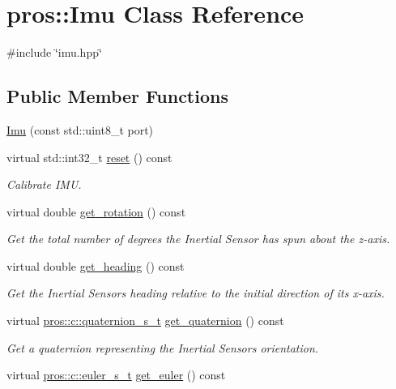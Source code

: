 \hypertarget{classpros_1_1Imu}{}\section{pros\+:\+:Imu Class Reference}
\label{classpros_1_1Imu}


{\ttfamily \#include \char`\"{}imu.\+hpp\char`\"{}}

\subsection*{Public Member Functions}
\begin{DoxyCompactItemize}
\item 
\hyperlink{classpros_1_1Imu_aac194322ec0563c1c73f540733e7cc4e}{Imu} (const std\+::uint8\+\_\+t port)
\item 
virtual std\+::int32\+\_\+t \hyperlink{classpros_1_1Imu_ad7973cfad5f8f83e7007342055197c43}{reset} () const
\begin{DoxyCompactList}\small\item\em Calibrate I\+MU. \end{DoxyCompactList}\item 
virtual double \hyperlink{classpros_1_1Imu_ac8bd7a19a6b4fc0c207a895efd3f0b48}{get\+\_\+rotation} () const
\begin{DoxyCompactList}\small\item\em Get the total number of degrees the Inertial Sensor has spun about the z-\/axis. \end{DoxyCompactList}\item 
virtual double \hyperlink{classpros_1_1Imu_a35c7953c5def3c034763af25c4dbebe3}{get\+\_\+heading} () const
\begin{DoxyCompactList}\small\item\em Get the Inertial Sensor\textquotesingle{}s heading relative to the initial direction of its x-\/axis. \end{DoxyCompactList}\item 
virtual \hyperlink{imu_8h_a1f3d4bf4251e6ce7cb374297de6390a1}{pros\+::c\+::quaternion\+\_\+s\+\_\+t} \hyperlink{classpros_1_1Imu_a3656b2476bb3ab8c2539615f76a0db39}{get\+\_\+quaternion} () const
\begin{DoxyCompactList}\small\item\em Get a quaternion representing the Inertial Sensor\textquotesingle{}s orientation. \end{DoxyCompactList}\item 
virtual \hyperlink{imu_8h_a93e80020ec907b7e11ac7166e5d01c55}{pros\+::c\+::euler\+\_\+s\+\_\+t} \hyperlink{classpros_1_1Imu_acd2f926bc97121518da774eefe6fc9e2}{get\+\_\+euler} () const

\end{DoxyCompactItemize}
